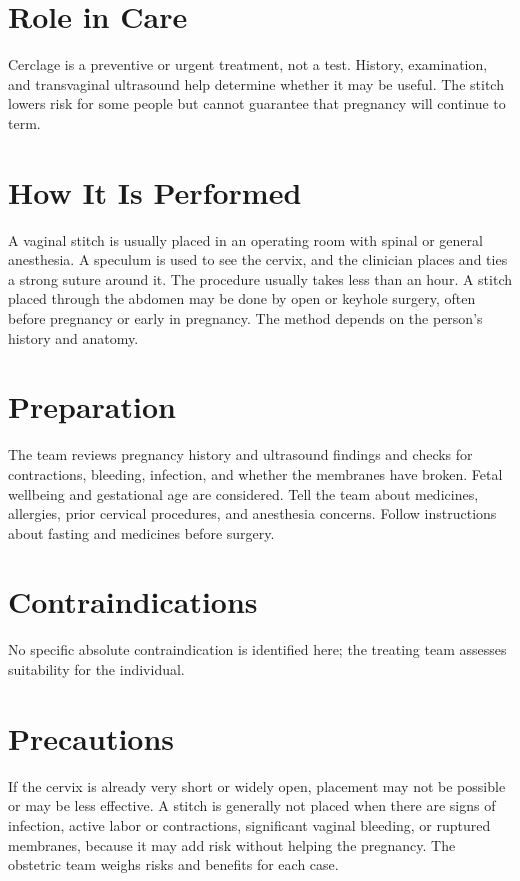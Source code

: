 \section*{Role in Care}
Cerclage is a preventive or urgent treatment, not a test. History, examination, and transvaginal ultrasound help determine whether it may be useful. The stitch lowers risk for some people but cannot guarantee that pregnancy will continue to term.

\section*{How It Is Performed}
A vaginal stitch is usually placed in an operating room with spinal or general anesthesia. A speculum is used to see the cervix, and the clinician places and ties a strong suture around it. The procedure usually takes less than an hour. A stitch placed through the abdomen may be done by open or keyhole surgery, often before pregnancy or early in pregnancy. The method depends on the person's history and anatomy.

\section*{Preparation}
The team reviews pregnancy history and ultrasound findings and checks for contractions, bleeding, infection, and whether the membranes have broken. Fetal wellbeing and gestational age are considered. Tell the team about medicines, allergies, prior cervical procedures, and anesthesia concerns. Follow instructions about fasting and medicines before surgery.

\section*{Contraindications}
No specific absolute contraindication is identified here; the treating team assesses suitability for the individual.

\section*{Precautions}
If the cervix is already very short or widely open, placement may not be possible or may be less effective. A stitch is generally not placed when there are signs of infection, active labor or contractions, significant vaginal bleeding, or ruptured membranes, because it may add risk without helping the pregnancy. The obstetric team weighs risks and benefits for each case.

